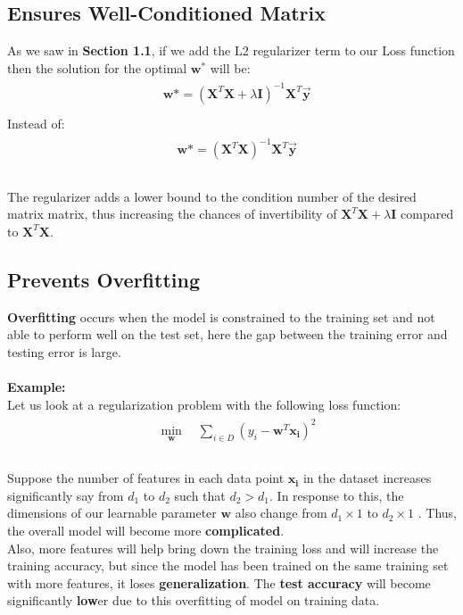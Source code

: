 \documentclass[12pt]{article}
\begin{document}
\subsection{Ensures Well-Conditioned Matrix}

As we saw in \textbf{Section 1.1}, if we add the L2 regularizer term to our Loss function then the solution for the optimal $\boldsymbol{w}^*$ will be:
\begin{gather}
    \begin{aligned}
        &  \boldsymbol{w}* = (\boldsymbol{X}^T\boldsymbol{X} + \lambda\boldsymbol{I})^{-1}\boldsymbol{X}^T\vec{\boldsymbol{y}}      \nonumber\\
    \end{aligned}
\end{gather}
Instead of:
\begin{gather}
    \begin{aligned}
        &  \boldsymbol{w}* = (\boldsymbol{X}^T\boldsymbol{X})^{-1}\boldsymbol{X}^T\vec{\boldsymbol{y}}      \nonumber\\
    \end{aligned}
\end{gather}
\\
The regularizer adds a lower bound to the condition number of the desired matrix matrix, thus increasing the chances of invertibility of $\boldsymbol{X}^T\boldsymbol{X} + \lambda\boldsymbol{I}$ compared to $\boldsymbol{X}^T\boldsymbol{X}$.
\subsection{Prevents Overfitting}
\textbf{Overfitting} occurs when the model is constrained to the training set and not able to perform well on the test set, here the gap between the training error and testing error is large. \\\\
\textbf{Example:}\\
Let us look at a regularization problem with the following loss function:\\
\begin{gather}
    \begin{aligned}
        & \min_{\boldsymbol{w}} \quad \sum_{i \in D}   (y_i - \boldsymbol{w}^T\boldsymbol{x_i})^2            \nonumber\\
    \end{aligned}
\end{gather}
\\
Suppose the number of features in each data point $\boldsymbol{x_i}$ in the dataset increases significantly say from $d_1$ to $d_2$ such that $d_2 > d_1$. In response to this, the dimensions of our learnable parameter $\boldsymbol{w}$ also change from $d_1\times 1$ to $d_2\times 1$ . Thus, the overall model will become more \textbf{complicated}. \\
Also, more features will help bring down the training loss and will increase the training accuracy, but since the model has been trained on the same training set with more features, it loses \textbf{generalization}. The \textbf{test accuracy} will become significantly \textbf{low}er due to this overfitting of model on training data.  
\end{document}
